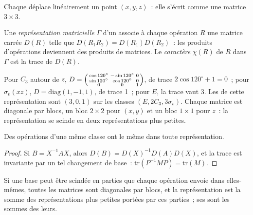 Chaque  déplace linéairement un point
$(x, y, z)$~: elle s'écrit comme une matrice $3\times3$.

\begin{definition}\label{def:b3:point-groups:representation}
Une \emph{représentation matricielle} $\Gamma$ d'un
 associe à chaque opération $R$ une matrice carrée $D(R)$
telle que
$D(R_1R_2) = D(R_1)D(R_2)$~: les produits d'opérations deviennent des
produits de matrices. Le \emph{caractère} $\chi(R)$ de $R$ dans $\Gamma$ est
la trace de $D(R)$.
\end{definition}

\begin{example}\label{ex:b3:point-groups:xyz}
Pour $C_3$ autour de $z$, $D = \begin{psmallmatrix}\cos120^\circ & -\sin120^\circ &
0\\ \sin120^\circ & \cos120^\circ & 0\\ 0 & 0 & 1\end{psmallmatrix}$, de
trace
$2\cos120^\circ + 1 = 0$~; pour $\sigma_v(xz)$, $D = \mathrm{diag}(1, -1, 1)$,
de trace 1~; pour $E$, la trace vaut 3. Les  de cette
représentation sont $(3, 0, 1)$ sur
les classes $(E, 2C_3, 3\sigma_v)$. Chaque matrice est diagonale par
blocs, un bloc
$2\times2$ pour $(x, y)$ et un bloc $1\times1$ pour $z$~: la
représentation se scinde en deux représentations plus petites.
\end{example}

\begin{proposition}\label{prop:b3:point-groups:class-characters}
Des opérations d'une même classe ont le même  dans toute
représentation.
\end{proposition}

\begin{proof}
Si $B = X^{-1}AX$, alors $D(B) = D(X)^{-1}D(A)D(X)$, et la trace est
invariante par un tel changement de base~: $\mathrm{tr}(P^{-1}MP) = \mathrm{tr}(M)$.
\end{proof}

\begin{proposition}\label{prop:b3:point-groups:direct-sum}
Si une base peut être scindée en parties que chaque opération envoie
dans elles-mêmes, toutes les matrices sont diagonales par blocs, et la
représentation est la somme des représentations plus petites portées
par ces parties~; ses  sont les sommes des leurs.
\end{proposition}

